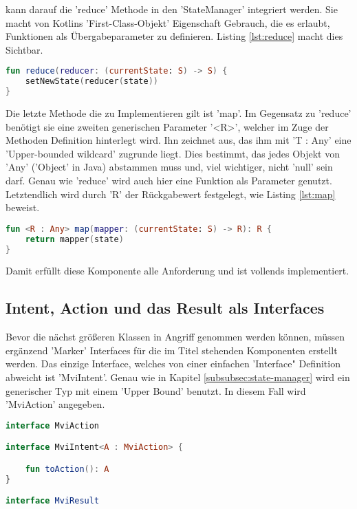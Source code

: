 \bigskip
kann darauf die 'reduce' Methode in den 'StateManager' integriert werden. Sie macht von Kotlins 'First-Class-Objekt' Eigenschaft Gebrauch, die es erlaubt, Funktionen als Übergabeparameter zu definieren. Listing
\ref{lst:reduce}
macht dies Sichtbar.
\begin{lstlisting}[caption={ 'reduce' Methode}, label={lst:reduce}, language=Kotlin]
fun reduce(reducer: (currentState: S) -> S) {
	setNewState(reducer(state))
}
\end{lstlisting}
\bigskip
Die letzte Methode die zu Implementieren gilt ist 'map'. Im Gegensatz zu 'reduce' benötigt sie eine zweiten generischen Parameter '<R>', welcher im Zuge der Methoden Definition hinterlegt wird. Ihn zeichnet aus, das ihm mit 'T : Any' eine 'Upper-bounded wildcard' zugrunde liegt. Dies bestimmt, das jedes Objekt von 'Any' ('Object' in Java) abstammen muss und, viel wichtiger, nicht 'null' sein darf.
Genau wie 'reduce' wird auch hier eine Funktion als Parameter genutzt.
Letztendlich wird durch 'R' der Rückgabewert festgelegt, wie Listing
\ref{lst:map}
beweist.
\begin{lstlisting}[caption={ 'map' Methode}, label={lst:map}, language=Kotlin]
fun <R : Any> map(mapper: (currentState: S) -> R): R {
	return mapper(state)
}
\end{lstlisting}
\bigskip
Damit erfüllt diese Komponente alle Anforderung und ist vollends implementiert.

\subsection{Intent, Action und das Result als Interfaces}
Bevor die nächst größeren Klassen in Angriff genommen werden können, müssen ergänzend 'Marker' Interfaces für die im Titel stehenden Komponenten erstellt werden. Das einzige Interface, welches von einer einfachen 'Interface" Definition abweicht ist 'MviIntent'. Genau wie in Kapitel
\ref{subsubsec:state-manager}
wird ein generischer Typ mit einem 'Upper Bound' benutzt. In diesem Fall wird 'MviAction' angegeben.
\begin{lstlisting}[caption={'Marker' Interfaces}, label={lst:marker-interfaces}, language=Kotlin]
interface MviAction

interface MviIntent<A : MviAction> {

	fun toAction(): A
}

interface MviResult
\end{lstlisting}

